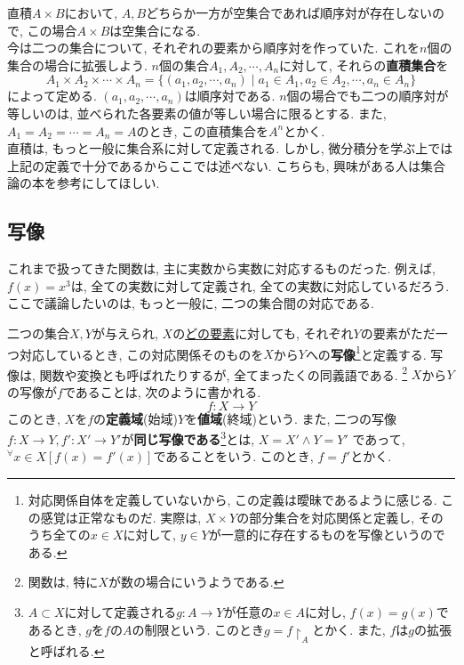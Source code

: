         直積$A\times B$において, $A,B$どちらか一方が空集合であれば順序対が存在しないので, この場合$A\times B$は空集合になる.\\

        今は二つの集合について, それぞれの要素から順序対を作っていた. これを$n$個の集合の場合に拡張しよう. $n$個の集合$A_1,A_2,\cdots,A_n$に対して, 
        それらの\textbf{直積集合}を
        \begin{equation}
            A_1\times A_2 \times \cdots \times A_n = \{(a_1,a_2,\cdots,a_n)\mid a_1\in A_1,a_2\in A_2,\cdots,a_n\in A_n\} \label{eq:集合論基礎:n個の直積の定義}
        \end{equation}
        によって定める. $(a_1,a_2,\cdots,a_n)$は順序対である. $n$個の場合でも二つの順序対が等しいのは, 並べられた各要素の値が等しい場合に限るとする.
        また, $A_1=A_2=\cdots=A_n=A$のとき, この直積集合を$A^n$とかく.\\

        直積は, もっと一般に集合系に対して定義される. しかし, 微分積分を学ぶ上では上記の定義で十分であるからここでは述べない.
        こちらも, 興味がある人は集合論の本を参考にしてほしい.
    \clearpage
    \subsection{写像}
        これまで扱ってきた関数は, 主に実数から実数に対応するものだった. 例えば, $f(x)=x^3$は, 全ての実数に対して定義され, 全ての実数に対応しているだろう.
        ここで議論したいのは, もっと一般に, 二つの集合間の対応である.
        
        二つの集合$X,Y$が与えられ, $X$の\underline{どの要素}に対しても, それぞれ$Y$の要素がただ一つ対応しているとき, この対応関係そのものを$X$から$Y$への\textbf{写像}\footnote{対応関係自体を定義していないから, この定義は曖昧であるように感じる. この感覚は正常なものだ. 実際は, $X\times Y$の部分集合を対応関係と定義し, そのうち全ての$x\in X$に対して, $y\in Y$が一意的に存在するものを写像というのである.}と定義する.
        写像は, 関数や変換とも呼ばれたりするが, 全てまったくの同義語である. \footnote{関数は, 特に$X$が数の場合にいうようである.} $X$から$Y$の写像が$f$であることは, 次のように書かれる.
        \begin{equation}
            f:X\rightarrow Y \label{eq:集合論基礎:写像の書き方}
        \end{equation}
        このとき, $X$を$f$の\textbf{定義域}(始域)$Y$を\textbf{値域}(終域)という. また, 二つの写像$f:X\rightarrow Y, f':X'\rightarrow Y'$が\textbf{同じ写像である}\footnote{$A\subset X$に対して定義される$g:A\rightarrow Y$が任意の$x\in A$に対し, $f(x)=g(x)$であるとき, $g$を$f$の$A$の制限という. このとき$g=f\upharpoonright_A$とかく. また, $f$は$g$の拡張と呼ばれる.}とは, $X=X'\land Y=Y'$
        であって, $^\forall x\in X [f(x)=f'(x)]$であることをいう. このとき, $f=f'$とかく.

